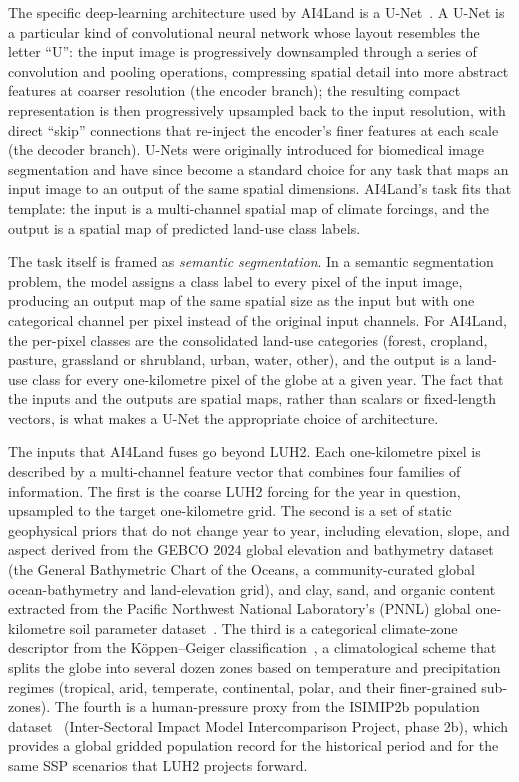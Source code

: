 \documentclass[12pt,a4paper]{article}
\begin{document}
The specific deep-learning architecture used by AI4Land is a U-Net~\cite{ronneberger2015unet}.
A U-Net is a particular kind of convolutional neural network whose layout resembles the
letter ``U'': the input image is progressively downsampled through a series of convolution and
pooling operations, compressing spatial detail into more abstract features at coarser
resolution (the encoder branch); the resulting compact representation is then progressively
upsampled back to the input resolution, with direct ``skip'' connections that re-inject the
encoder's finer features at each scale (the decoder branch). U-Nets were originally introduced
for biomedical image segmentation and have since become a standard choice for any task that
maps an input image to an output of the same spatial dimensions. AI4Land's task fits that
template: the input is a multi-channel spatial map of climate forcings, and the output is a
spatial map of predicted land-use class labels.

The task itself is framed as \emph{semantic segmentation}. In a semantic segmentation
problem, the model assigns a class label to every pixel of the input image, producing an
output map of the same spatial size as the input but with one categorical channel per pixel
instead of the original input channels. For AI4Land, the per-pixel classes are the consolidated
land-use categories (forest, cropland, pasture, grassland or shrubland, urban, water, other),
and the output is a land-use class for every one-kilometre pixel of the globe at a given
year. The fact that the inputs and the outputs are spatial maps, rather than scalars or
fixed-length vectors, is what makes a U-Net the appropriate choice of architecture.

The inputs that AI4Land fuses go beyond LUH2. Each one-kilometre pixel is described by a
multi-channel feature vector that combines four families of information. The first is the
coarse LUH2 forcing for the year in question, upsampled to the target one-kilometre grid.
The second is a set of static geophysical priors that do not change year to year, including
elevation, slope, and aspect derived from the GEBCO 2024 global elevation and bathymetry
dataset~\cite{gebco2024} (the General Bathymetric Chart of the Oceans, a community-curated
global ocean-bathymetry and land-elevation grid), and clay, sand, and organic content
extracted from the Pacific Northwest National Laboratory's (PNNL) global one-kilometre soil
parameter dataset~\cite{li2024soil}. The third is a categorical climate-zone descriptor from
the K\"{o}ppen--Geiger classification~\cite{beck2023koppen}, a climatological scheme that
splits the globe into several dozen zones based on temperature and precipitation regimes
(tropical, arid, temperate, continental, polar, and their finer-grained sub-zones). The
fourth is a human-pressure proxy from the ISIMIP2b population dataset~\cite{frieler2017isimip}
(Inter-Sectoral Impact Model Intercomparison Project, phase 2b), which provides a global
gridded population record for the historical period and for the same SSP scenarios that LUH2
projects forward.
\end{document}
